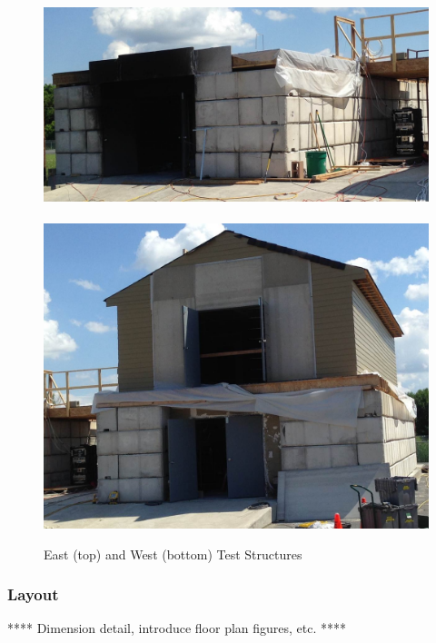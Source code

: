 \documentclass[12pt,oneside]{book}
\begin{document}
\begin{figure}[!ht]
\includegraphics[width=6in]{../Pictures/east_structure}
\\~\\
\includegraphics[width=6in]{../Pictures/west_structure}
\caption[East and West Test Structures]{East (top) and West (bottom) Test Structures}
\label{fig:struct_pics}
\end{figure}

\clearpage

\subsubsection{Layout}
\label{subsubsec:layout}
**** Dimension detail, introduce floor plan figures, etc. ****
\end{document}
